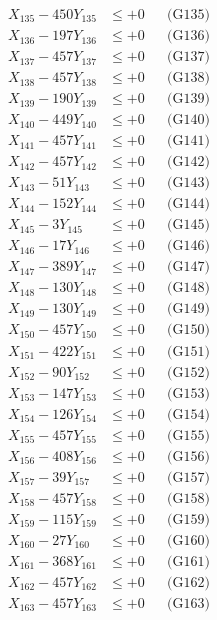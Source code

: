 \documentclass[a4paper,10pt]{article}
\begin{document}
{\begin{align}
X_{135} - 450Y_{135} &\leq +0 && \text{(G135)} \\
X_{136} - 197Y_{136} &\leq +0 && \text{(G136)} \\
X_{137} - 457Y_{137} &\leq +0 && \text{(G137)} \\
X_{138} - 457Y_{138} &\leq +0 && \text{(G138)} \\
X_{139} - 190Y_{139} &\leq +0 && \text{(G139)} \\
X_{140} - 449Y_{140} &\leq +0 && \text{(G140)} \\
\allowbreak
X_{141} - 457Y_{141} &\leq +0 && \text{(G141)} \\
X_{142} - 457Y_{142} &\leq +0 && \text{(G142)} \\
X_{143} - 51Y_{143} &\leq +0 && \text{(G143)} \\
X_{144} - 152Y_{144} &\leq +0 && \text{(G144)} \\
X_{145} - 3Y_{145} &\leq +0 && \text{(G145)} \\
X_{146} - 17Y_{146} &\leq +0 && \text{(G146)} \\
X_{147} - 389Y_{147} &\leq +0 && \text{(G147)} \\
X_{148} - 130Y_{148} &\leq +0 && \text{(G148)} \\
X_{149} - 130Y_{149} &\leq +0 && \text{(G149)} \\
X_{150} - 457Y_{150} &\leq +0 && \text{(G150)} \\
\allowbreak
X_{151} - 422Y_{151} &\leq +0 && \text{(G151)} \\
X_{152} - 90Y_{152} &\leq +0 && \text{(G152)} \\
X_{153} - 147Y_{153} &\leq +0 && \text{(G153)} \\
X_{154} - 126Y_{154} &\leq +0 && \text{(G154)} \\
X_{155} - 457Y_{155} &\leq +0 && \text{(G155)} \\
X_{156} - 408Y_{156} &\leq +0 && \text{(G156)} \\
X_{157} - 39Y_{157} &\leq +0 && \text{(G157)} \\
X_{158} - 457Y_{158} &\leq +0 && \text{(G158)} \\
X_{159} - 115Y_{159} &\leq +0 && \text{(G159)} \\
X_{160} - 27Y_{160} &\leq +0 && \text{(G160)} \\
\allowbreak
X_{161} - 368Y_{161} &\leq +0 && \text{(G161)} \\
X_{162} - 457Y_{162} &\leq +0 && \text{(G162)} \\
X_{163} - 457Y_{163} &\leq +0 && \text{(G163)} \\

\end{align}}
\end{document}
